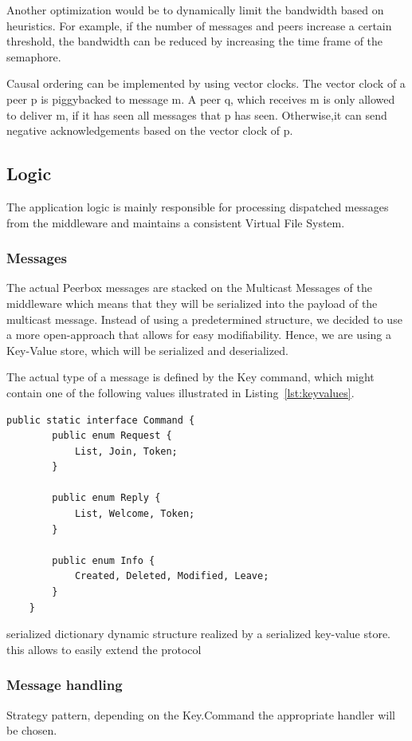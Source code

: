 Another optimization would be to dynamically limit the bandwidth based on heuristics. For example, if the number of messages and peers increase a certain threshold, the bandwidth can be reduced by increasing the time frame of the semaphore. 

Causal ordering can be implemented by using vector clocks. The vector clock of a peer p is piggybacked to message m. A peer q, which receives m is only allowed to deliver m, if it has seen all messages that p has seen. Otherwise,it can send negative acknowledgements based on the vector clock of p. 

\subsection{Logic}
The application logic is mainly responsible for processing dispatched messages from the middleware and maintains a consistent Virtual File System.
    
    \subsubsection{Messages}   
The actual Peerbox messages are stacked on the Multicast Messages of the middleware which means that they will be serialized into the payload of the multicast message. 
Instead of using a predetermined structure, we decided to use a more open-approach that allows for easy modifiability. Hence, we are using a Key-Value store, which will be serialized and deserialized. 

The actual type of a message is defined by the Key command, which might contain one of the following values illustrated in Listing~\ref{lst:keyvalues}.

\begin{lstlisting}[caption=Possible values of command]
public static interface Command {
		public enum Request {
			List, Join, Token;
		}

		public enum Reply {
			List, Welcome, Token;
		}

		public enum Info {
			Created, Deleted, Modified, Leave;
		}
	}
\end{lstlisting}
    serialized dictionary
    dynamic structure realized by a serialized key-value store. 
    this allows to easily extend the protocol



\subsubsection{Message handling}
Strategy pattern, depending on the Key.Command the appropriate handler will be chosen.

